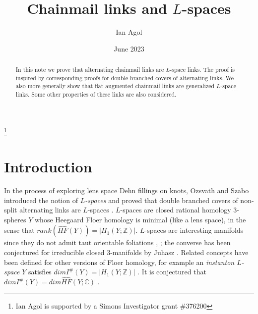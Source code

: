 \documentclass{amsart}
\theoremstyle{definition}
\theoremstyle{remark}
\begin{document}
\title{Chainmail links and $L$-spaces}

\author[Ian Agol]{%
        Ian Agol} 
\address{%
    University of California, Berkeley \\
    970 Evans Hall \#3840 \\
    Berkeley, CA 94720-3840} 
     

% 
\thanks{Ian Agol is supported by a Simons Investigator grant  \#376200}

\date{%
June 2023} 


\begin{abstract}
In this note we prove that alternating chainmail links are $L$-space links. The proof is inspired by corresponding proofs for double branched covers of alternating links. We also more generally show that flat augmented chainmail links are generalized $L$-space links. Some other properties of these links are also considered. 
 
\end{abstract}

\maketitle


\section{Introduction}
In the process of exploring lens space Dehn fillings on knots, Ozsvath and Szabo introduced the notion of {\it $L$-spaces }\cite[Definition 1.1]{MR2168576} and proved that double branched covers of non-split alternating links are $L$-spaces \cite[Lemma 3.2, Proposition 3.3]{MR2141852}. $L$-spaces are closed rational homology 3-spheres $Y$ whose Heegaard Floer homology is minimal (like a lens space), in the sense that $rank(\widehat{HF}(Y))=|H_1(Y;\mathbb{Z})|$. $L$-spaces are interesting manifolds since they do not admit taut orientable foliations \cite[Theorem 1.4]{OZ0311496}, \cite[Corollary 1.6]{MR3693573}; the converse has been conjectured for irreducible closed 3-manifolds by Juhasz \cite[Conjecture 5]{MR3381327}. Related concepts have been defined for other versions of Floer homology, for example an {\it instanton $L$-space} $Y$ satisfies $dim I^\#(Y) = |H_1(Y;\mathbb{Z})|$ \cite[Definition 1.13]{Baldwin_2022}. It is conjectured that $dimI^\#(Y)=dim \widehat{HF}(Y;\mathbb{C})$ \cite[Conjecture 7.24]{MR2652464}. 
\end{document}
